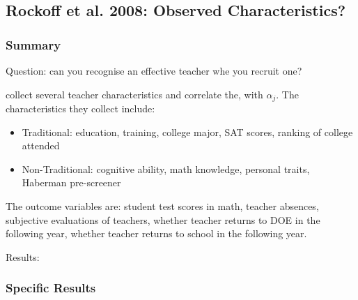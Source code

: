     \subsection{Rockoff et al. 2008: Observed Characteristics?}

        \subsubsection{Summary}

            Question: can you recognise an effective teacher whe you recruit one?
    
            \cite{rockoff_can_2011} collect several teacher characteristics and correlate the, with $\alpha_j$. The characteristics they collect include:
            \begin{itemize}
                \item Traditional: education, training, college major, SAT scores, ranking of college attended
                \item Non-Traditional: cognitive ability, math knowledge, personal traits, Haberman pre-screener
            \end{itemize}
            The outcome variables are: student test scores in math, teacher absences, subjective evaluations of teachers, whether teacher returns to DOE in the following year, whether  teacher returns to school in the following year.
    
            Results: 

        \subsubsection{Specific Results}

